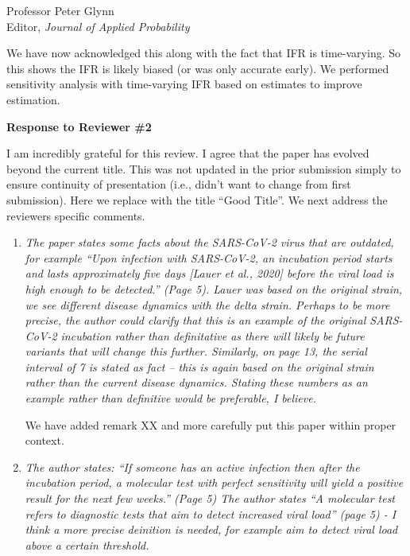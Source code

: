 \documentclass[11pt]{letter} %
\begin{document}
\begin{letter}{Professor
	Peter Glynn\\
	Editor, {\em Journal of Applied Probability}}
\begin{enumerate}
\begin{enumerate}
    We have now acknowledged this along with the fact that IFR is time-varying. So this shows the IFR is likely biased (or was only accurate early).  We performed sensitivity analysis with time-varying IFR based on estimates to improve estimation.
	\vspace{5mm}
\end{enumerate}
\end{enumerate}
\newpage

{\bf Response to Reviewer \#2}

I am incredibly grateful for this review.  I agree that the paper has evolved beyond the current title.  This was not updated in the prior submission simply to ensure continuity of presentation (i.e., didn't want to change from first submission).  Here we replace with the title ``Good Title''.  We next address the reviewers specific comments.

\begin{enumerate}
\item {\it The paper states some facts about the SARS-CoV-2 virus that are outdated, for example “Upon infection with SARS-CoV-2, an incubation period starts and lasts approximately five days [Lauer et al., 2020] before the viral load is high enough to be detected.” (Page 5). Lauer was based on the original
strain, we see different disease dynamics with the delta strain. Perhaps to be more precise, the author could clarify that this is an example of the original SARS-CoV-2 incubation rather than definitative as there will likely be future variants that will change this further. Similarly, on page 13, the serial
interval of 7 is stated as fact – this is again based on the original strain rather than the current disease dynamics. Stating these numbers as an example rather than definitive would be preferable, I believe.}
\vspace{5mm}

We have added remark XX and more carefully put this paper within proper context.
\vspace{5mm}
\item {\it The author states: “If someone has an active infection then after the incubation period, a molecular test with perfect sensitivity will yield a positive result for the next few weeks.” (Page 5) The author states “A molecular test refers to diagnostic tests that aim to detect increased viral load” (page 5) - I think a more precise deinition is needed, for example aim to detect viral load above a certain threshold.}
\vspace{5mm}


\end{enumerate}
\end{letter}
\end{document}
